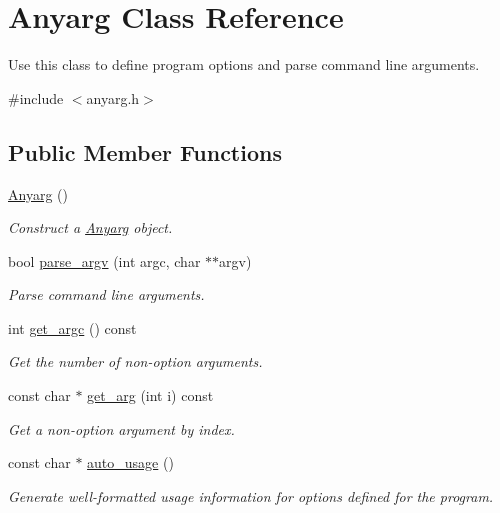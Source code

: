 \hypertarget{class_anyarg}{\section{Anyarg Class Reference}
\label{class_anyarg}
}


Use this class to define program options and parse command line arguments.  




{\ttfamily \#include $<$anyarg.\-h$>$}

\subsection*{Public Member Functions}
\begin{DoxyCompactItemize}
\item 
\hyperlink{class_anyarg_a6d4bbf6e762e77d89ffa7756359b6a62}{Anyarg} ()
\begin{DoxyCompactList}\small\item\em Construct a \hyperlink{class_anyarg}{Anyarg} object. \end{DoxyCompactList}\item 
bool \hyperlink{class_anyarg_ab38a13c5d241224bb14d8e474bbe70de}{parse\-\_\-argv} (int argc, char $\ast$$\ast$argv)
\begin{DoxyCompactList}\small\item\em Parse command line arguments. \end{DoxyCompactList}\item 
int \hyperlink{class_anyarg_a3cffbadc85f2fd4086e9a91ac1c5d666}{get\-\_\-argc} () const 
\begin{DoxyCompactList}\small\item\em Get the number of non-\/option arguments. \end{DoxyCompactList}\item 
const char $\ast$ \hyperlink{class_anyarg_a98c55821efc66a45f1132ffa90689928}{get\-\_\-arg} (int i) const 
\begin{DoxyCompactList}\small\item\em Get a non-\/option argument by index. \end{DoxyCompactList}\item 
const char $\ast$ \hyperlink{class_anyarg_a1dd740c033f8ff539dc2c6f4001e11f9}{auto\-\_\-usage} ()
\begin{DoxyCompactList}\small\item\em Generate well-\/formatted usage information for options defined for the program. \end{DoxyCompactList}\end{DoxyCompactItemize}
